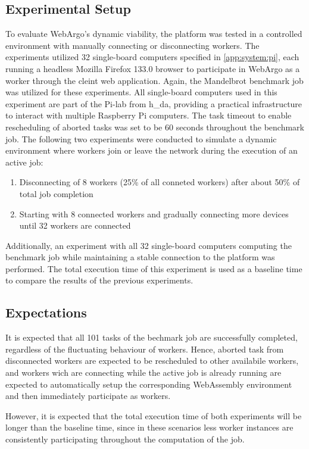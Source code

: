 \subsection{Experimental Setup}
To evaluate WebArgo's dynamic viability, the platform was tested in a controlled environment with manually connecting or disconnecting workers. The experiments utilized 32 single-board computers specified in \autoref{app:system:pi}, each running a headless Mozilla Firefox 133.0 \cite{background:firefox2} browser to participate in WebArgo as a worker through the cleint web application. Again, the Mandelbrot benchmark job was utilized for these experiments. All single-board computers used in this experiment are part of the Pi-lab from h\_da, providing a practical infrastructure to interact with multiple Raspberry Pi computers. The task timeout to enable rescheduling of aborted tasks was set to be 60 seconds throughout the benchmark job. The following two experiments were conducted to simulate a dynamic environment where workers join or leave the network during the execution of an active job:
\begin{enumerate}
    \item Disconnecting of 8 workers (25\% of all conneted workers) after about 50\% of total job completion 
    \item Starting with 8 connected workers and gradually connecting more devices until 32 workers are connected
\end{enumerate}
Additionally, an experiment with all 32 single-board computers computing the benchmark job while maintaining a stable connection to the platform was performed. The total execution time of this experiment is used as a baseline time to compare the results of the previous experiments.

\subsection{Expectations}
It is expected that all 101 tasks of the bechmark job are successfully completed, regardless of the fluctuating behaviour of workers. Hence, aborted task from disconnected workers are expected to be rescheduled to other availabile workers, and workers wich are connecting while the active job is already running are expected to automatically setup the corresponding WebAssembly environment and then immediately participate as workers.

However, it is expected that the total execution time of both experiments will be longer than the baseline time, since in these scenarios less worker instances are consistently participating throughout the computation of the job. 

